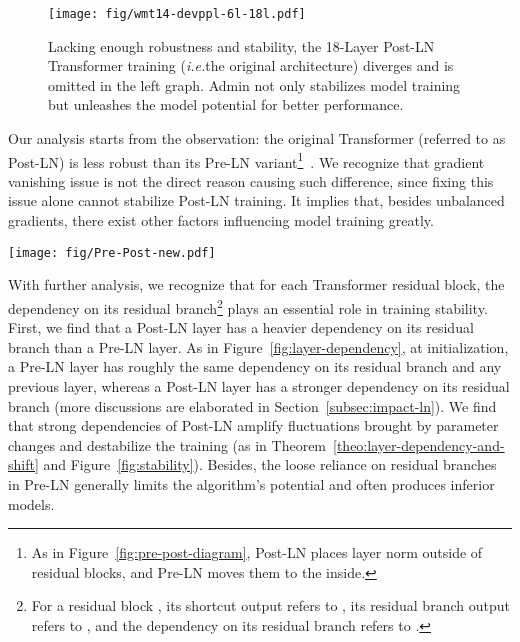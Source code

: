 \documentclass[11pt,a4paper]{article}
\newcommand{\our}{\mbox{Admin}\xspace}
\newcommand{\ie}{\textit{i.e.}}
\begin{document}
\begin{figure}[t]
\centering
\texttt{[image: fig/wmt14-devppl-6l-18l.pdf]}
\caption{Lacking enough robustness and stability, the 18-Layer Post-LN Transformer training (\ie the original architecture) diverges and is omitted in the left graph. \our not only stabilizes model training but unleashes the model potential for better performance. 
}
\label{fig:wmt14ende_devppl_6_18}
\end{figure}

Our analysis starts from the observation: the original Transformer (referred to as Post-LN) is less robust than its Pre-LN variant\footnote{As in Figure~\ref{fig:pre-post-diagram}, Post-LN places layer norm outside of residual blocks, and Pre-LN moves them to the inside.}~\cite{Baevski2018AdaptiveIR,Xiong2019OnLN,Nguyen2019TransformersWT}. 
We recognize that gradient vanishing issue is not the direct reason causing such difference, since fixing this issue alone cannot stabilize Post-LN training. 
It implies that, besides unbalanced gradients, there exist other factors influencing model training greatly. 



\begin{figure*}[t]
\centering
\texttt{[image: fig/Pre-Post-new.pdf]}
\caption{The Architecture and notations of Pre-LN Transformers (Left) and Post-LN Transformers (Right).}
\label{fig:pre-post-diagram}
\end{figure*}
 
With further analysis, we recognize that for each Transformer residual block, the dependency on its residual branch\footnote{For a residual block , its shortcut output refers to , its residual branch output refers to , and the dependency on its residual branch refers to .} plays an essential role in training stability. 
First, we find that a Post-LN layer has a heavier dependency on its residual branch than a Pre-LN layer.
As in Figure~\ref{fig:layer-dependency}, at initialization, a Pre-LN layer has roughly the same dependency on its residual branch and any previous layer, whereas a Post-LN layer has a stronger dependency on its residual branch 
(more discussions are elaborated in Section~\ref{subsec:impact-ln}). 
We find that strong dependencies of Post-LN amplify fluctuations brought by parameter changes and destabilize the training (as in Theorem~\ref{theo:layer-dependency-and-shift} and Figure~\ref{fig:stability}). 
Besides, the loose reliance on residual branches in Pre-LN generally limits the algorithm's potential and often produces inferior models.  
\end{document}

